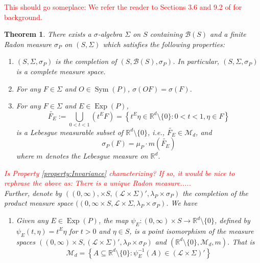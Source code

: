 \documentclass[11pt]{article}
\newtheorem{theorem}{Theorem}[section]
\newcommand\Sym{\operatorname{Sym}}
\newcommand\Exp{\operatorname{Exp}}
\begin{document}
\textcolor{red}{This should go someplace: We refer the reader to Sections 3.6 and 9.2 of \cite{Bogachev2007} for background.}

\begin{theorem}\label{thm:BestIntegrationFormula}
There exists a $\sigma$-algebra $\Sigma$ on $S$ containing $\mathcal{B}(S)$ and a finite Radon measure $\sigma_P$ on $(S,\Sigma)$ which satisfies the following properties:
\begin{enumerate}
\item\label{property:Completion} $(S,\Sigma,\sigma_P)$ is the completion of $(S,\mathcal{B}(S),\sigma_P)$. In particular, $(S,\Sigma,\sigma_P)$ is a complete measure space.
\item\label{property:Invariance} For any $F\in\Sigma$ and $O\in\Sym(P)$, $\sigma(OF)=\sigma(F)$.
\item\label{property:DefiningConditionofsigma} For any $F\in\Sigma$ and $E\in\Exp(P)$, 
\begin{equation*}
\widetilde{F_E}:=\bigcup_{0<t<1}\left(t^E F\right)=\left\{t^E\eta\in\mathbb{R}^d\setminus\{0\}:0<t<1,\eta\in F\right\}
\end{equation*}
is a Lebesgue measurable subset of $\mathbb{R}^d\setminus \{0\}$, i.e., $\widetilde{F_E}\in\mathcal{M}_d$, and
\begin{equation*}
\sigma_P(F)=\mu_P\cdot m\left(\widetilde{F_E}\right)
\end{equation*}
where $m$ denotes the Lebesgue measure on $\mathbb{R}^d$.
\end{enumerate}
\textcolor{red}{Is Property \ref{property:Invariance} characterizing? If so, it would be nice to rephrase the above as: There is a unique Radon measure..... \\}
Further, denote by $\left((0,\infty),\times S,(\mathcal{L}\times\Sigma)',\lambda_P\times\sigma_P\right)$ the completion of the product measure space $((0,\infty\times S,\mathcal{L}\times\Sigma,\lambda_P\times\sigma_P)$. We have
\begin{enumerate}
\item\label{property:BestPointIsomorphism} Given any $E\in \Exp(P)$, the map $\psi_E:(0,\infty)\times S\to\mathbb{R}^d\setminus\{0\}$, defined by $\psi_E(t,\eta)=t^E\eta$ for $t>0$ and $\eta\in S$, is a point isomorphism of the measure spaces $\left((0,\infty)\times S,(\mathcal{L}\times\Sigma)',\lambda_P\times\sigma_P\right)$ and $(\mathbb{R}^d\setminus\{0\},\mathcal{M}_d,m)$. That is
\begin{equation*}
\mathcal{M}_d=\left\{A\subseteq \mathbb{R}^d\setminus\{0\}:\psi_E^{-1}(A)\in (\mathcal{L}\times\Sigma)'\right\}

\end{equation*}
\end{enumerate}
\end{theorem}
\end{document}
